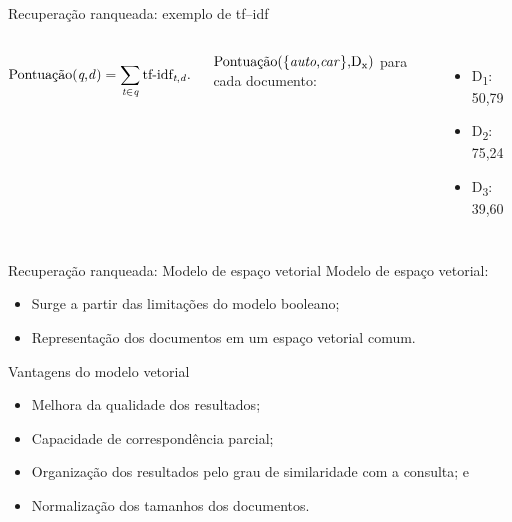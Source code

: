 \documentclass[%
  10pt,%
  aspectratio = 169,%
  compress,%
  t,%
]{beamer}%
\begin{document}
    \begin{frame}[fragile = singleslide]{}{Recuperação ranqueada: exemplo de tf--idf}
        \begin{columns}[t]
            
            
            \begin{equation}
                \label{eq:pontuação-simples-tf-idf}
                \text{Pontuação(\textit{q},\textit{d})} = \sum_{\textit{t} \in \textit{q}}^{} \text{tf-idf}_{\text{\textit{t},\textit{d}}}.
            \end{equation}
            
            \vspace{1cm}
            
            $\text{Pontuação(\{\textit{auto},\textit{car}\},D\textsubscript{x})}$ para cada documento:
            \begin{itemize}
                \setlength\itemsep{-0.2em}
                \item D\textsubscript{1}: 50,79
                \item D\textsubscript{2}: 75,24
                \item D\textsubscript{3}: 39,60
            \end{itemize}
        \end{columns}
    \end{frame}
    
    \begin{frame}[fragile = singleslide]{}{Recuperação ranqueada: Modelo de espaço vetorial}
        Modelo de espaço vetorial:
        \begin{itemize}
            \item Surge a partir das limitações do modelo booleano;
        
            \item Representação dos documentos em um espaço vetorial comum.
        \end{itemize}
        
        
        \begin{block}{Vantagens do modelo vetorial}
            \begin{itemize}
                \item Melhora da qualidade dos resultados;
                
                \item Capacidade de correspondência parcial;
                
                \item Organização dos resultados pelo grau de similaridade com a consulta; e
                
                \item Normalização dos tamanhos dos documentos.
            \end{itemize}
        \end{block}
    \end{frame}
    
\end{document}
